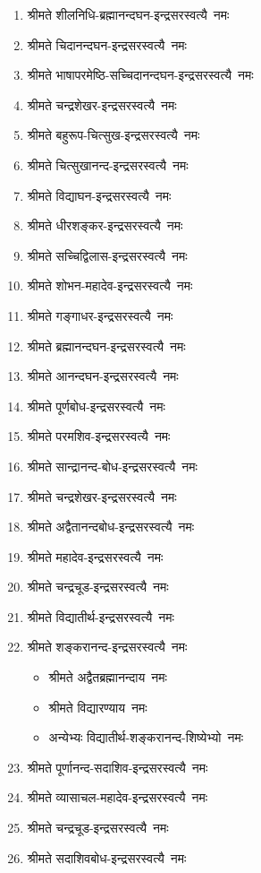 \begin{center}
\begin{flushleft}
\begin{enumerate}
\item श्रीमते शीलनिधि-ब्रह्मानन्दघन-इन्द्रसरस्वत्यै~नमः
\item श्रीमते चिदानन्दघन-इन्द्रसरस्वत्यै~नमः
\item श्रीमते भाषापरमेष्ठि-सच्चिदानन्दघन-इन्द्रसरस्वत्यै~नमः
\item श्रीमते चन्द्रशेखर-इन्द्रसरस्वत्यै~नमः
\item श्रीमते बहुरूप-चित्सुख-इन्द्रसरस्वत्यै~नमः
\item श्रीमते चित्सुखानन्द-इन्द्रसरस्वत्यै~नमः
\item श्रीमते विद्याघन-इन्द्रसरस्वत्यै~नमः
\item श्रीमते धीरशङ्कर-इन्द्रसरस्वत्यै~नमः
\item श्रीमते सच्चिद्विलास-इन्द्रसरस्वत्यै~नमः
\item श्रीमते शोभन-महादेव-इन्द्रसरस्वत्यै~नमः
\item श्रीमते गङ्गाधर-इन्द्रसरस्वत्यै~नमः
\item श्रीमते ब्रह्मानन्दघन-इन्द्रसरस्वत्यै~नमः
\item श्रीमते आनन्दघन-इन्द्रसरस्वत्यै~नमः
\item श्रीमते पूर्णबोध-इन्द्रसरस्वत्यै~नमः
\item श्रीमते परमशिव-इन्द्रसरस्वत्यै~नमः
\item श्रीमते सान्द्रानन्द-बोध-इन्द्रसरस्वत्यै~नमः
\item श्रीमते चन्द्रशेखर-इन्द्रसरस्वत्यै~नमः
\item श्रीमते अद्वैतानन्दबोध-इन्द्रसरस्वत्यै~नमः
\item श्रीमते महादेव-इन्द्रसरस्वत्यै~नमः
\item श्रीमते चन्द्रचूड-इन्द्रसरस्वत्यै~नमः
\item श्रीमते विद्यातीर्थ-इन्द्रसरस्वत्यै~नमः
\item श्रीमते शङ्करानन्द-इन्द्रसरस्वत्यै~नमः
\begin{itemize}%
\item श्रीमते अद्वैतब्रह्मानन्दाय~नमः
\item श्रीमते विद्यारण्याय~नमः
\item अन्येभ्यः विद्यातीर्थ-शङ्करानन्द-शिष्येभ्यो~नमः
\end{itemize}
\item श्रीमते पूर्णानन्द-सदाशिव-इन्द्रसरस्वत्यै~नमः
\item श्रीमते व्यासाचल-महादेव-इन्द्रसरस्वत्यै~नमः
\item श्रीमते चन्द्रचूड-इन्द्रसरस्वत्यै~नमः
\item श्रीमते सदाशिवबोध-इन्द्रसरस्वत्यै~नमः

\end{enumerate}
\end{flushleft}
\end{center}
